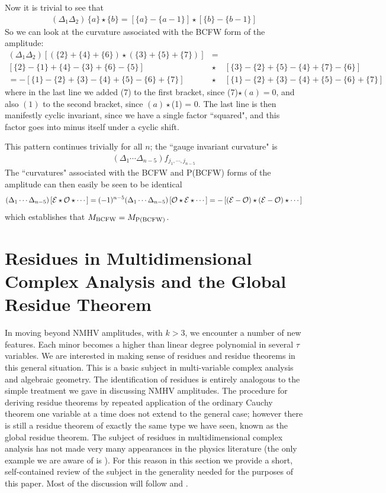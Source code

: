 \documentclass[12pt]{article}
\newcommand{\be}{\begin{eqnarray}}
\newcommand{\ee}{\end{eqnarray}}
\begin{document}
Now it is trivial to see that
\be
(\Delta_1 \Delta_2)  \, \{a\} \star \{b\} = [\{a\} - \{a-1\}] \star [\{b\} - \{b-1\}]
\ee
So we can look at the curvature associated with the BCFW form of the amplitude:
\begin{eqnarray}
(\Delta_1 \Delta_2) \left[\left(\{2\}+ \{4\} + \{6\}\right) \star \left(\{3\} + \{5\} + \{7\}\right)\right] \!\!\!\! & = &\nonumber \\
\left[\{2\} - \{1\} + \{4\} - \{3\} + \{6\}- \{5\}\right]\!\!\!\! & \star & \!\!\!\! \left[\{3\} - \{2\} + \{5\} - \{4\} + \{7\}- \{6\}\right] \nonumber \\
= -\left[\{1\} - \{2\} + \{3\} - \{4\} + \{5\} - \{6\} + \{7\}\right]\!\!\!\! & \star & \!\!\!\! \left[\{1\} - \{2\} + \{3\} - \{4\} + \{5\} - \{6\}+ \{7\}\right] \nonumber \end{eqnarray}
where in the last line we added (7) to the first bracket, since (7)$\star (a) = 0$, and also $(1)$ to the second bracket, since $(a) \star$(1) = 0. The last line is then manifestly cyclic invariant, since we have a single factor ``squared", and this factor goes into minus itself under a cyclic shift.

This pattern continues trivially for all $n$; the ``gauge invariant curvature" is
\be
(\Delta_1 \cdots \Delta_{n-5}) f_{j_1,\cdots,j_{n-5}}
\ee
The ``curvatures" associated with the BCFW and P(BCFW) forms of the amplitude can then easily be seen to be identical
\be\nonumber
(\Delta_1 \cdots \Delta_{n-5}) \left[{\cal E} \star {\cal O} \star \cdots \right] =
(-1)^{n-5}(\Delta_1 \cdots \Delta_{n-5}) \left[{\cal O} \star {\cal E} \star \cdots \right] =
- \left[({\cal E} - {\cal O}) \star ({\cal E} - {\cal O}) \star \cdots \right]
\ee
which establishes that $M_{{\rm BCFW}} = M_{{\rm P(BCFW)}}$.

\section{Residues in Multidimensional Complex Analysis and the Global Residue Theorem}

In moving beyond NMHV amplitudes, with $k>3$, we encounter a number of new features. Each minor becomes a higher than linear degree polynomial in several $\tau$ variables. We are interested in making sense of residues and residue theorems in this general situation. This is a basic subject in multi-variable complex analysis and algebraic geometry. The identification of residues is entirely analogous to the simple treatment we gave in discussing NMHV amplitudes. The procedure for deriving residue theorems by repeated application of the ordinary Cauchy theorem one variable at a time does not extend to the general case; however there is still a residue theorem of exactly the same type we have seen, known as the global residue theorem.
The subject of residues in multidimensional complex analysis has not made very many appearances in the physics literature (the only example we are aware of is \cite{Beasley:2003fx}). For this reason in this section we provide a short, self-contained review of the subject in the generality needed for the purposes of this paper. Most of the discussion will follow \cite{GH} and \cite{Tsikh}.
\end{document}
